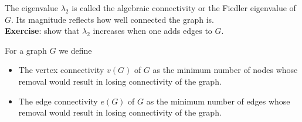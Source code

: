 \documentclass[11pt,nocut]{article}
\begin{document}
The eigenvalue $\lambda_2$ is called the algebraic connectivity or the Fiedler eigenvalue of $G$. Its magnitude reflects how well connected the graph is.
\\
\textbf{Exercise}: show that $\lambda_2$ increases when one adds edges to $G$.

\begin{definition}
	For a graph $G$ we define
	\begin{itemize}
		\item The vertex connectivity $v(G)$ of $G$ as the minimum number of nodes whose removal would result in losing connectivity of the graph.
		\item The edge connectivity $e(G)$ of $G$ as the minimum number of edges whose removal would result in losing connectivity of the graph.
	\end{itemize}
\end{definition}
\end{document}
